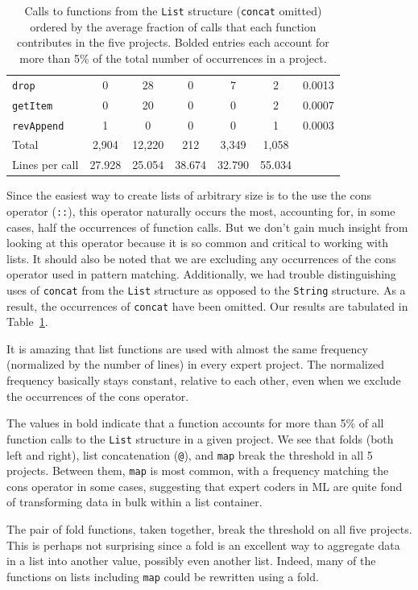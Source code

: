 \documentclass[12pt,abstracton]{scrartcl}
\begin{document}
\begin{table}[h!]
\begin{tabular}{|l||c|c|c|c|c||c|}
\texttt{drop} & 0 & 28 & 0 & 7 & 2 & 0.0013 \\
\texttt{getItem} & 0 & 20 & 0 & 0 & 2 & 0.0007 \\
\texttt{revAppend} & 1 & 0 & 0 & 0 & 1 & 0.0003 \\
\hline\hline
Total & 2,904 & 12,220 & 212 & 3,349 & 1,058 & \\
Lines per call & 27.928 & 25.054 & 38.674 & 32.790 & 55.034 & \\\hline
\end{tabular}
\caption{Calls to functions from the \texttt{List} structure (\texttt{concat} omitted) ordered by the average
fraction of calls that each function contributes in the five projects.
Bolded entries each account for more than 5\% of the total number of occurrences in a project.}
\label{table:list}
\end{table}

Since the easiest way to create lists of arbitrary size is to the use the cons operator (\texttt{::}),
this operator naturally occurs the most, accounting for, in some cases, half
the occurrences of function calls. But we don't gain much insight from looking at this operator
because it is so common and critical to working with lists. It should also be noted
that we are excluding any occurrences of the cons operator used in pattern matching.
Additionally, we had trouble distinguishing uses of \texttt{concat} from the \texttt{List} structure
as opposed to the \texttt{String} structure. As a result, the occurrences of \texttt{concat} have been omitted.
Our results are tabulated in Table~\ref{table:list}.

It is amazing that list functions are used with almost the same frequency (normalized
by the number of lines) in every expert project. The normalized frequency
basically stays constant, relative to each other, even when we exclude the occurrences of the cons operator.

The values in bold indicate that a function accounts for more than 5\% of all function calls to the \texttt{List} structure in a given project.
We see that folds (both left and right), list concatenation (\texttt{@}), and \texttt{map} break the threshold in all 5 projects. Between them,
\texttt{map} is most common, with a frequency matching the cons operator in some cases,
suggesting that expert coders in ML are quite fond of transforming data in bulk within a list container.

The pair of fold functions, taken together, break the threshold on all five projects.
This is perhaps not surprising since a fold is an excellent way to aggregate data in a list
into another value, possibly even another list. Indeed, many of the functions on lists
including \texttt{map} could be rewritten using a fold.
\end{document}
